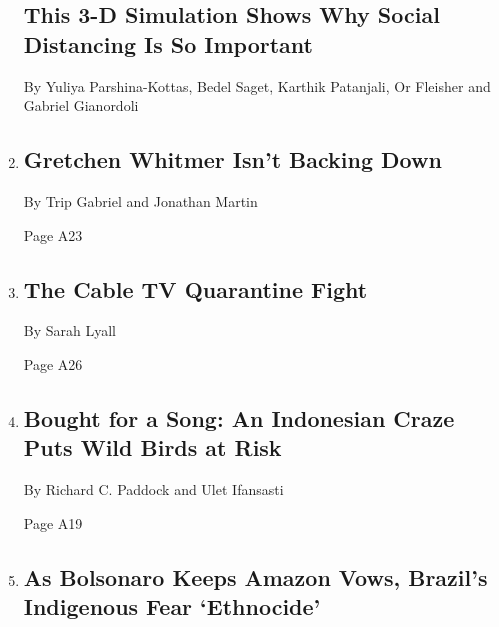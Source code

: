 \begin{enumerate}
{  \subsection{This 3-D Simulation Shows Why Social Distancing Is So
  Important}\label{this-3-d-simulation-shows-why-social-distancing-is-so-important}}

  By Yuliya Parshina-Kottas, Bedel Saget, Karthik Patanjali, Or Fleisher
  and Gabriel Gianordoli
\item
  \href{/2020/04/18/us/politics/gretchen-whitmer-michigan-protests.html}{}

  \hypertarget{gretchen-whitmer-isnt-backing-down}{%
  \subsection{Gretchen Whitmer Isn't Backing
  Down}\label{gretchen-whitmer-isnt-backing-down}}

  By Trip Gabriel and Jonathan Martin

  Page A23
\item
  \href{/2020/04/17/us/politics/fox-news-msnbc-coronavirus.html}{}

  \hypertarget{the-cable-tv-quarantine-fight}{%
  \subsection{The Cable TV Quarantine
  Fight}\label{the-cable-tv-quarantine-fight}}

  By Sarah Lyall

  Page A26
\item
  \href{/2020/04/18/world/asia/indonesia-songbirds-competition.html}{}

  \hypertarget{bought-for-a-song-an-indonesian-craze-puts-wild-birds-at-risk}{%
  \subsection{Bought for a Song: An Indonesian Craze Puts Wild Birds at
  Risk}\label{bought-for-a-song-an-indonesian-craze-puts-wild-birds-at-risk}}

  By Richard C. Paddock and Ulet Ifansasti

  Page A19
\item
  \href{/2020/04/19/world/americas/bolsonaro-brazil-amazon-indigenous.html}{}

  \hypertarget{as-bolsonaro-keeps-amazon-vows-brazils-indigenous-fear-ethnocide}{%
  \subsection{As Bolsonaro Keeps Amazon Vows, Brazil's Indigenous Fear
  `Ethnocide'}\label{as-bolsonaro-keeps-amazon-vows-brazils-indigenous-fear-ethnocide}}


\end{enumerate}
